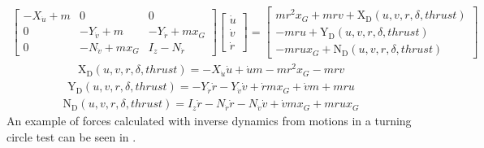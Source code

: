 \documentclass[review]{elsarticle}
\begin{document}
\begin{equation}\label{equation:03.01_inverse_dynamics:eqsystem}
\begin{split}\displaystyle \left[\begin{matrix}- X_{\dot{u}} + m & 0 & 0\\0 & - Y_{\dot{v}} + m & - Y_{\dot{r}} + m x_{G}\\0 & - N_{\dot{v}} + m x_{G} & I_{z} - N_{\dot{r}}\end{matrix}\right] \left[\begin{matrix}\dot{u}\\\dot{v}\\\dot{r}\end{matrix}\right] = \left[\begin{matrix}m r^{2} x_{G} + m r v + \operatorname{X_{D}}{\left(u,v,r,\delta,thrust \right)}\\- m r u + \operatorname{Y_{D}}{\left(u,v,r,\delta,thrust \right)}\\- m r u x_{G} + \operatorname{N_{D}}{\left(u,v,r,\delta,thrust \right)}\end{matrix}\right]\end{split}
\end{equation}\begin{equation}\label{equation:03.01_inverse_dynamics:eqxd}
\begin{split}\displaystyle \operatorname{X_{D}}{\left(u,v,r,\delta,thrust \right)} = - X_{\dot{u}} \dot{u} + \dot{u} m - m r^{2} x_{G} - m r v\end{split}
\end{equation}\begin{equation}\label{equation:03.01_inverse_dynamics:eqyd}
\begin{split}\displaystyle \operatorname{Y_{D}}{\left(u,v,r,\delta,thrust \right)} = - Y_{\dot{r}} \dot{r} - Y_{\dot{v}} \dot{v} + \dot{r} m x_{G} + \dot{v} m + m r u\end{split}
\end{equation}\begin{equation}\label{equation:03.01_inverse_dynamics:eqnd}
\begin{split}\displaystyle \operatorname{N_{D}}{\left(u,v,r,\delta,thrust \right)} = I_{z} \dot{r} - N_{\dot{r}} \dot{r} - N_{\dot{v}} \dot{v} + \dot{v} m x_{G} + m r u x_{G}\end{split}
\end{equation}
\sphinxAtStartPar
An example of forces calculated with inverse dynamics from motions in a turning circle test can be seen in {\hyperref[\detokenize{03.01_inverse_dynamics:fig-inverse}]{}}.
\end{document}
